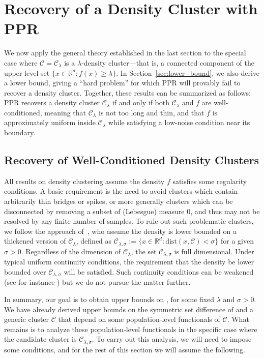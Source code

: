 \documentclass[twoside,11pt]{article}
\newcommand{\Reals}{\mathbb{R}}
\newcommand{\1}{\mathbf{1}}
\newcommand{\Rd}{\Reals^d}
\newcommand{\mc}[1]{\mathcal{#1}}
\newcommand{\wh}[1]{\widehat{#1}}
\newcommand{\dist}{\mathrm{dist}}
\begin{document}
\section{Recovery of a Density Cluster with PPR}
\label{sec:ppr_density_cluster}
We now apply the general theory established in the last section to the special case where $\mc{C} = \mc{C}_{\lambda}$ is a $\lambda$-density cluster---that is, a connected component of the upper level set $\{x \in \Rd: f(x) \geq \lambda\}$. In Section~\ref{sec:lower_bound}, we also derive a lower bound, giving a ``hard problem'' for which PPR will provably fail to recover a density cluster. Together, these results can be summarized as follows: PPR recovers a density cluster $\mc{C}_{\lambda}$ if and only if both $\mc{C}_{\lambda}$ and $f$ are well-conditioned, meaning that $\mc{C}_{\lambda}$ is not too long and thin, and that $f$ is approximately uniform inside $\mc{C}_{\lambda}$ while satisfying a low-noise condition near its boundary.

\subsection{Recovery of Well-Conditioned Density Clusters}
\label{subsec:recovery_well-conditioned_density_clusters}

All results on density clustering assume the density $f$ satisfies some regularity conditions. A basic requirement is the need to avoid clusters which contain arbitrarily thin bridges or spikes, or more generally clusters which can be disconnected by removing a subset of (Lebesgue) measure $0$, and thus may not be resolved by any finite number of samples. To rule out such problematic clusters, we follow the approach of~\cite{chaudhuri2010}, who assume the density is lower bounded on a thickened version of $\mc{C}_{\lambda}$, defined as $\mc{C}_{\lambda,\sigma} := \{x \in \Rd: \dist(x,\mc{C}) < \sigma\}$ for a given $\sigma > 0$. Regardless of the dimension of $\mc{C}_{\lambda}$, the set $\mc{C}_{\lambda,\sigma}$ is full dimensional. Under typical uniform continuity conditions, the requirement that the density be lower bounded over $\mc{C}_{\lambda,\sigma}$ will be satisfied. Such continuity conditions can be weakened (see for instance \citet{rinaldo2010,steinwart2015}) but we do not pursue the matter further.

In summary, our goal is to obtain upper bounds on \smash{$\Delta(\wh{C},\mc{C}_{\lambda,\sigma}[X])$}, for some fixed $\lambda$ and $\sigma > 0$. We have already derived upper bounds on the symmetric set difference of \smash{$\wh{C}$} and a generic cluster $\mc{C}$ that depend on some population-level functionals of $\mc{C}$. What remains is to analyze these population-level functionals in the specific case where the candidate cluster is $\mc{C}_{\lambda,\sigma}$. To carry out this analysis, we will need to impose some conditions, and for the rest of this section we will assume the following.
\end{document}
